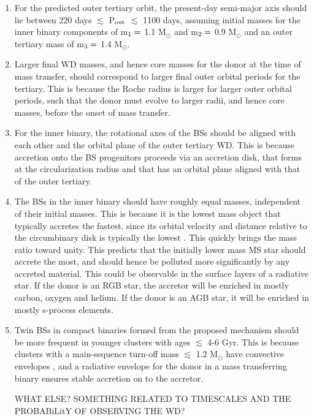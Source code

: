 \documentclass{aastex62}
\begin{document}
\begin{enumerate}

\item For the predicted outer tertiary orbit, the present-day semi-major axis should lie between 220 days $\lesssim$ P$_{\rm out}$ $\lesssim$ 1100 days, assuming initial masses for the inner binary components of m$_{\rm 1} =$ 1.1 M$_{\odot}$ and m$_{\rm 2} =$ 0.9 M$_{\odot}$ and an outer tertiary mass of m$_{\rm 3} =$ 1.4 M$_{\odot}$.

\item Larger final WD masses, and hence core masses for the donor at the time of mass transfer, should correspond to larger final outer orbital periods for the tertiary.  This is because the Roche radius is larger for larger outer orbital periods, such that the donor must evolve to larger radii, and hence core masses, before the onset of mass transfer.

\item For the inner binary, the rotational axes of the BSs should be aligned with each other and the orbital plane of the outer tertiary WD.  This is because accretion onto the BS progenitors proceeds via an accretion disk, that forms at the circularization radius and that has an orbital plane aligned with that of the outer tertiary.

\item The BSs in the inner binary should have roughly equal masses, independent of their initial masses.  This is because it is the lowest mass object that typically accretes the fastest, since its orbital velocity and distance relative to the circumbinary disk is typically the lowest \citep[e.g.][]{haiman09,farris15,rafikov16,kelley17}.  This quickly brings the mass ratio toward unity.  This predicts that the initially lower mass MS star should accrete the most, and should hence be polluted more significantly by any accreted material.  This could be observable in the surface layers of a radiative star.  If the donor is an RGB star, the accretor will be enriched in mostly carbon, oxygen and helium.  If the donor is an AGB star, it will be enriched in mostly s-process elements.

\item Twin BSs in compact binaries formed from the proposed mechanism should be more frequent in younger clusters with ages $\lesssim$ 4-6 Gyr.  This is because clusters with a main-sequence turn-off mass $\lesssim$ 1.2 M$_{\odot}$ have convective envelopes \citep[e.g.][]{iben91,maedoer09}, and a radiative envelope for the donor in a mass transferring binary ensures stable accretion on to the accretor.

WHAT ELSE?  SOMETHING RELATED TO TIMESCALES AND THE PROBABiLitY OF OBSERVING THE WD?

\end{enumerate}
\end{document}

